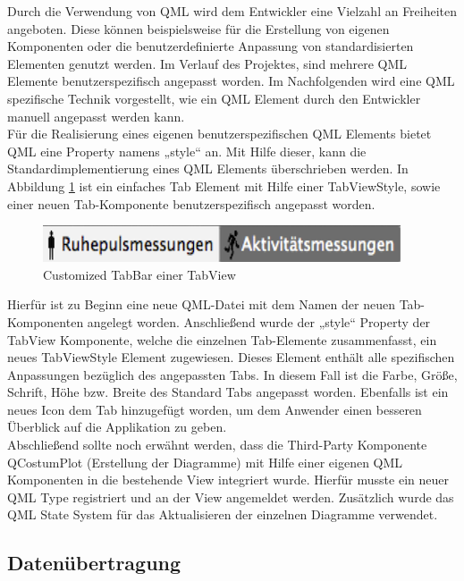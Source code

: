 Durch die Verwendung von QML wird dem Entwickler eine Vielzahl an Freiheiten angeboten. Diese können beispielsweise für die Erstellung von eigenen Komponenten oder die benutzerdefinierte Anpassung von standardisierten Elementen genutzt werden. Im Verlauf des Projektes, sind mehrere QML Elemente benutzerspezifisch angepasst worden. Im Nachfolgenden wird eine QML spezifische Technik vorgestellt, wie ein QML Element durch den Entwickler manuell angepasst werden kann. \\

Für die Realisierung eines eigenen benutzerspezifischen QML Elements bietet QML  eine Property namens „style“ an. Mit Hilfe dieser, kann die Standardimplementierung eines QML Elements überschrieben werden. In Abbildung \ref{pic:TabView} ist ein einfaches Tab Element mit Hilfe einer TabViewStyle, sowie einer neuen Tab-Komponente benutzerspezifisch angepasst worden.

\begin{figure}[H]
	\centering
	\includegraphics[scale=0.6]{images/TabView.png}
	\caption{Customized TabBar einer TabView}
	\label{pic:TabView}
\end{figure}

Hierfür ist zu Beginn eine neue QML-Datei mit dem Namen der neuen Tab-Komponenten angelegt worden. Anschließend wurde der „style“ Property der TabView Komponente, welche die einzelnen Tab-Elemente zusammenfasst, ein neues TabViewStyle Element zugewiesen. Dieses Element enthält alle spezifischen Anpassungen bezüglich des angepassten Tabs. In diesem Fall ist die Farbe, Größe, Schrift, Höhe bzw. Breite des Standard Tabs angepasst worden. Ebenfalls ist ein neues Icon dem Tab hinzugefügt worden, um dem Anwender einen besseren Überblick auf die Applikation zu geben. \\

Abschließend sollte noch erwähnt werden, dass die Third-Party Komponente QCostumPlot (Erstellung der Diagramme) mit Hilfe einer eigenen QML Komponenten in die bestehende View integriert wurde. Hierfür musste ein neuer QML Type registriert und an der View angemeldet werden. Zusätzlich wurde das QML State System für das Aktualisieren der einzelnen Diagramme verwendet.

\cite{qmlevents} \cite{qmldoc} \cite{qmltuto} \cite{tabviewstyleBib}

\subsection{Datenübertragung}

